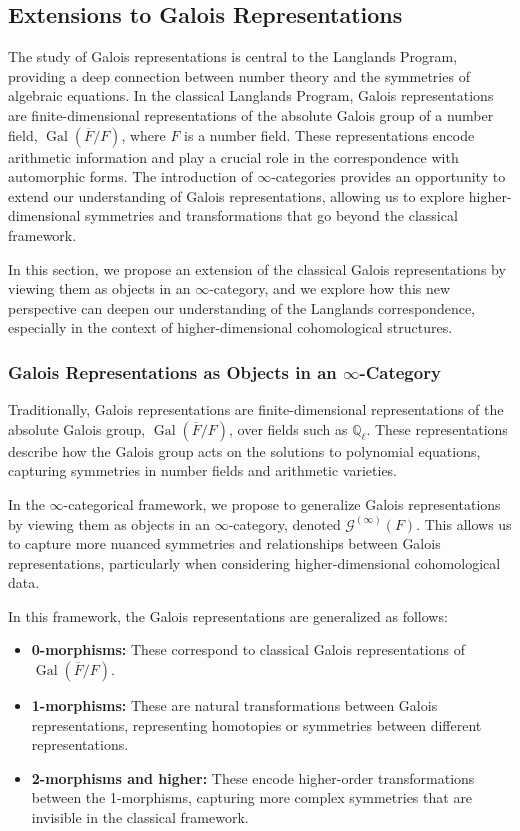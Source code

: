 \documentclass{article}
\theoremstyle{remark}
\begin{document}
\subsection{Extensions to Galois Representations}

The study of Galois representations is central to the Langlands Program, providing a deep connection between number theory and the symmetries of algebraic equations. In the classical Langlands Program, Galois representations are finite-dimensional representations of the absolute Galois group of a number field, $\operatorname{Gal}(\overline{F}/F)$, where $F$ is a number field. These representations encode arithmetic information and play a crucial role in the correspondence with automorphic forms. The introduction of $\infty$-categories provides an opportunity to extend our understanding of Galois representations, allowing us to explore higher-dimensional symmetries and transformations that go beyond the classical framework.

In this section, we propose an extension of the classical Galois representations by viewing them as objects in an $\infty$-category, and we explore how this new perspective can deepen our understanding of the Langlands correspondence, especially in the context of higher-dimensional cohomological structures.

\subsubsection{Galois Representations as Objects in an $\infty$-Category}

Traditionally, Galois representations are finite-dimensional representations of the absolute Galois group, $\operatorname{Gal}(\overline{F}/F)$, over fields such as $\mathbb{Q}_\ell$. These representations describe how the Galois group acts on the solutions to polynomial equations, capturing symmetries in number fields and arithmetic varieties.

In the $\infty$-categorical framework, we propose to generalize Galois representations by viewing them as objects in an $\infty$-category, denoted $\mathcal{G}^{(\infty)}(F)$. This allows us to capture more nuanced symmetries and relationships between Galois representations, particularly when considering higher-dimensional cohomological data.

In this framework, the Galois representations are generalized as follows:
\begin{itemize}
    \item \textbf{0-morphisms:} These correspond to classical Galois representations of $\operatorname{Gal}(\overline{F}/F)$.
    \item \textbf{1-morphisms:} These are natural transformations between Galois representations, representing homotopies or symmetries between different representations.
    \item \textbf{2-morphisms and higher:} These encode higher-order transformations between the 1-morphisms, capturing more complex symmetries that are invisible in the classical framework.
\end{itemize}
\end{document}
